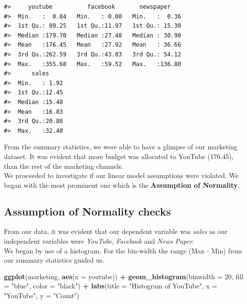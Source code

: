 \documentclass[
  10pt,
]{article}
\newenvironment{Shaded}{\begin{snugshade}}{\end{snugshade}}
\newcommand{\AttributeTok}[1]{\textcolor[rgb]{0.13,0.29,0.53}{#1}}
\newcommand{\DecValTok}[1]{\textcolor[rgb]{0.00,0.00,0.81}{#1}}
\newcommand{\FunctionTok}[1]{\textcolor[rgb]{0.13,0.29,0.53}{\textbf{#1}}}
\newcommand{\NormalTok}[1]{#1}
\newcommand{\SpecialCharTok}[1]{\textcolor[rgb]{0.81,0.36,0.00}{\textbf{#1}}}
\newcommand{\StringTok}[1]{\textcolor[rgb]{0.31,0.60,0.02}{#1}}
\begin{document}
\begin{verbatim}
#>     youtube          facebook       newspaper     
#>  Min.   :  0.84   Min.   : 0.00   Min.   :  0.36  
#>  1st Qu.: 89.25   1st Qu.:11.97   1st Qu.: 15.30  
#>  Median :179.70   Median :27.48   Median : 30.90  
#>  Mean   :176.45   Mean   :27.92   Mean   : 36.66  
#>  3rd Qu.:262.59   3rd Qu.:43.83   3rd Qu.: 54.12  
#>  Max.   :355.68   Max.   :59.52   Max.   :136.80  
#>      sales      
#>  Min.   : 1.92  
#>  1st Qu.:12.45  
#>  Median :15.48  
#>  Mean   :16.83  
#>  3rd Qu.:20.88  
#>  Max.   :32.40
\end{verbatim}

From the summary statistics, we were able to have a glimpse of our
marketing dataset. It was evident that more budget was allocated to
YouTube (176.45), than the rest of the marketing channels.\\
We proceeded to investigate if our linear model assumptions were
violated. We began with the most prominent one which is the
\textbf{Assumption of Normality}.\\

\subsection{Assumption of Normality
checks}\label{assumption-of-normality-checks}

From our data, it was evident that our dependent variable was
\emph{sales} as our independent variables were \emph{YouTube},
\emph{Facebook} and \emph{News Paper}.\\
We began by use of a histogram. For the bin-width the range (Max - Min)
from our summary statistics guided us.\\

\begin{Shaded}
\begin{Highlighting}[]
\FunctionTok{ggplot}\NormalTok{(marketing, }\FunctionTok{aes}\NormalTok{(}\AttributeTok{x =}\NormalTok{ youtube)) }\SpecialCharTok{+} \FunctionTok{geom\_histogram}\NormalTok{(}\AttributeTok{binwidth =} \DecValTok{20}\NormalTok{,}
    \AttributeTok{fill =} \StringTok{"blue"}\NormalTok{, }\AttributeTok{color =} \StringTok{"black"}\NormalTok{) }\SpecialCharTok{+} \FunctionTok{labs}\NormalTok{(}\AttributeTok{title =} \StringTok{"Histogram of YouTube"}\NormalTok{,}
    \AttributeTok{x =} \StringTok{"YouTube"}\NormalTok{, }\AttributeTok{y =} \StringTok{"Count"}\NormalTok{)}
\end{Highlighting}
\end{Shaded}
\end{document}
